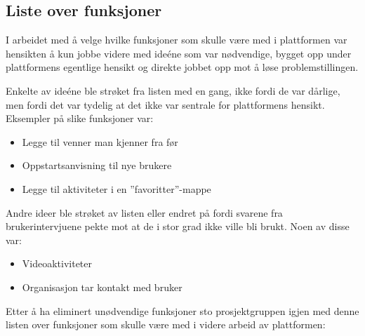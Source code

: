 \subsection{Liste over funksjoner}
I arbeidet med å velge hvilke funksjoner som skulle være med i plattformen var hensikten å kun jobbe videre med ideéne som var nødvendige, bygget opp under plattformens egentlige hensikt og direkte jobbet opp mot å løse problemstillingen.

Enkelte av ideéne ble strøket fra listen med en gang, ikke fordi de var dårlige, men fordi det var tydelig at det ikke var sentrale for plattformens hensikt. Eksempler på slike funksjoner var:

\begin{itemize}
    \item Legge til venner man kjenner fra før
    \item Oppstartsanvisning til nye brukere
    \item Legge til aktiviteter i en ''favoritter''-mappe
\end{itemize}

Andre ideer ble strøket av listen eller endret på fordi svarene fra brukerintervjuene pekte mot at de i stor grad ikke ville bli brukt. Noen av disse var:

\begin{itemize}
    \item Videoaktiviteter
    \item Organisasjon tar kontakt med bruker
\end{itemize}

Etter å ha eliminert unødvendige funksjoner sto prosjektgruppen igjen med denne listen over funksjoner som skulle være med i videre arbeid av plattformen:

